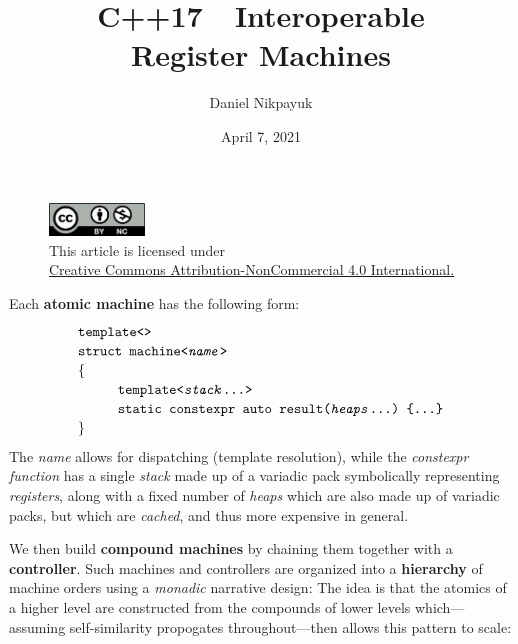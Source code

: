 \documentclass[twoside]{article}
\title{C++17\ \ Interoperable\\Register Machines}
\author{Daniel Nikpayuk}
\date{April 7, 2021}
\newcommand{\strong}[1]{{\bfseries #1}}
\newcommand{\tab}[1][1.125cm]{\hspace{#1}}
\begin{document}
\maketitle
\thispagestyle{empty}

\begin{figure}[h]
\centering
\includegraphics[width=1in]{../../../cc-by-nc.png}\\[0.1in]
\tiny This article is licensed under \\
\href{http://creativecommons.org/licenses/by-nc/4.0/}
{Creative Commons Attribution-NonCommercial 4.0 International.}\\[0.3in]
\end{figure}

\noindent Each \strong{atomic machine} has the following form:
$$ \def\arraystretch{1.15}
\tab[0cm] \begin{array}{l}
\texttt{template<>}									\\
\texttt{struct machine<\emph{name}>}							\\
\{											\\
\tab[1cm]\texttt{template<\emph{stack}\ldots>}						\\
\tab[1cm]\texttt{static constexpr auto result(\emph{heaps}\ldots)\ \{\ldots\}}		\\
\}
\end{array} $$
The \emph{name} allows for dispatching (template resolution), while the \emph{constexpr function}
has a single \emph{stack} made up of a variadic pack symbolically representing \emph{registers},
along with a fixed number of \emph{heaps} which are also made up of variadic packs, but which
are \emph{cached}, and thus more expensive in general.

We then build \strong{compound machines} by chaining them together with a \strong{controller}.
Such machines and controllers are organized into a \strong{hierarchy} of machine orders using
a \emph{monadic} narrative design: The idea is that the atomics of a higher level are constructed
from the compounds of lower levels which---assuming self-similarity propogates throughout---then
allows this pattern to scale:

\newpage
\end{document}
